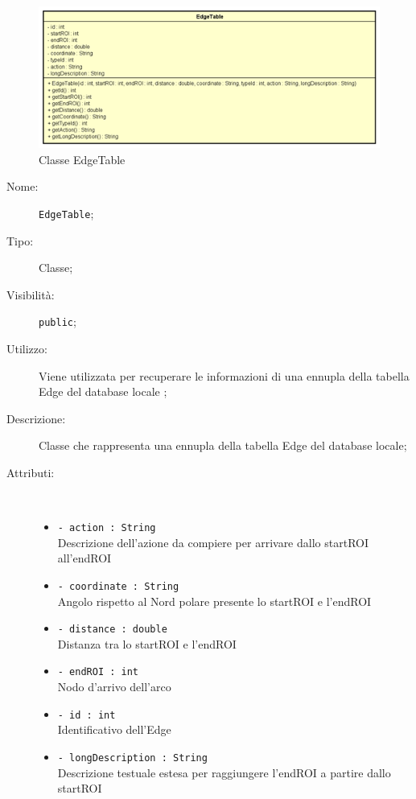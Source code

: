 \documentclass[../DefinizioneDiProdotto.tex]{subfiles}
\begin{document}
    \begin{figure}[H]
        \centering
        \includegraphics{img/EdgeTable.png}
        \caption{Classe EdgeTable}\label{fig:model::dataaccess::dao::EdgeTable} 
    \end{figure}
    \begin{description}
\item[Nome:] \texttt{EdgeTable};
\item[Tipo:] Classe;
\item[Visibilità:] \texttt{public};
\item[Utilizzo:] Viene utilizzata per recuperare le informazioni di una ennupla della tabella Edge del database locale ;
\item[Descrizione:] Classe che rappresenta una ennupla della tabella Edge del database locale;
\item[Attributi:] \
\begin{itemize}
\item \texttt{- action : String}\\
Descrizione dell'azione da compiere per arrivare dallo startROI all'endROI

\item \texttt{- coordinate : String}\\
Angolo rispetto al Nord polare presente lo startROI e l'endROI

\item \texttt{- distance : double}\\
Distanza tra lo startROI e l'endROI

\item \texttt{- endROI : int}\\
Nodo d'arrivo dell'arco

\item \texttt{- id : int}\\
Identificativo dell'Edge

\item \texttt{- longDescription : String}\\
Descrizione testuale estesa per raggiungere l'endROI a partire dallo startROI


\end{itemize}
\end{description}
\end{document}
